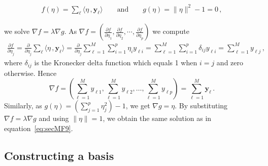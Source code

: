 \documentclass[letter,12pt]{article}
\begin{document}
\begin{align}\label{eq:secMF6}
	f(\eta)  = \sum_{\ell}\langle \eta\, , \bm{y}_{\ell} \rangle \qquad \text{and} \qquad
	g(\eta) =  \lVert\eta\rVert^2 - 1 = 0 \, ,
\end{align}

we solve $\nabla f = \lambda \nabla g$.  As $\nabla f = \left( \frac{\partial f}{\partial \eta_1}, \frac{\partial f}{\partial \eta_2}, \cdots, \frac{\partial f}{\partial \eta_p} \right)$ we compute
\begin{align}\label{eq:secMF7}
	\frac{\partial f}{\partial \eta_j}
     = \frac{\partial }{\partial \eta_j}\sum_{\ell}\langle \eta\, , \bm{y}_{\ell}\rangle
     = \frac{\partial }{\partial \eta_j} \sum_{\ell=1}^M \sum_{i=1}^p \eta_i y_{\ell i}
     = \sum_{\ell=1}^M \sum_{i=1}^p \delta_{ij} y_{\ell i}
     = \sum_{\ell=1}^M y_{\ell j} \, ,
\end{align}
where $\delta_{ij}$ is the Kronecker delta function which equals 1 when $i=j$ and zero otherwise. Hence
\begin{equation}\label{eq:secMF8}
	\nabla f = \left(\sum_{\ell=1}^M y_{\ell1}, \sum_{\ell=1}^M y_{\ell2}, \dots, \sum_{\ell=1}^M y_{\ell p} \right) = \sum_{\ell=1}^M \bm{y}_\ell \, .
\end{equation}
Similarly, as $g(\eta) = \left( \sum_{j=1}^p \eta_j^2\right) - 1$, we get $\nabla g = \eta$. By substituting $\nabla f = \lambda \nabla g$ and using $\lVert\eta\rVert = 1$, we obtain the same solution as in equation~\ref{eq:secMF9}.

\subsection{Constructing a basis}\label{sec:MathFrame3}
\end{document}
